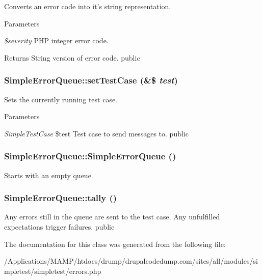 \label{class_simple_error_queue_a686f876e93208736cee9fd57dc8223d9}
Converts an error code into it's string representation. 
\begin{DoxyParams}{Parameters}
\item[{\em \$severity}]PHP integer error code. \end{DoxyParams}
\begin{DoxyReturn}{Returns}
String version of error code.  public 
\end{DoxyReturn}
\hypertarget{class_simple_error_queue_a300faf86411587f253d3bf21203ab0ce}{
\subsubsection[{setTestCase}]{\setlength{\rightskip}{0pt plus 5cm}SimpleErrorQueue::setTestCase (\&\$ {\em test})}}
\label{class_simple_error_queue_a300faf86411587f253d3bf21203ab0ce}
Sets the currently running test case. 
\begin{DoxyParams}{Parameters}
\item[{\em SimpleTestCase}]\$test Test case to send messages to.  public \end{DoxyParams}
\hypertarget{class_simple_error_queue_aefbdb398de53916724572d3432000e80}{
\subsubsection[{SimpleErrorQueue}]{\setlength{\rightskip}{0pt plus 5cm}SimpleErrorQueue::SimpleErrorQueue ()}}
\label{class_simple_error_queue_aefbdb398de53916724572d3432000e80}
Starts with an empty queue. \hypertarget{class_simple_error_queue_a7349f2d81db012130fa9e792077caa76}{
\subsubsection[{tally}]{\setlength{\rightskip}{0pt plus 5cm}SimpleErrorQueue::tally ()}}
\label{class_simple_error_queue_a7349f2d81db012130fa9e792077caa76}
Any errors still in the queue are sent to the test case. Any unfulfilled expectations trigger failures.  public 

The documentation for this class was generated from the following file:\begin{DoxyCompactItemize}
\item 
/Applications/MAMP/htdocs/drump/drupalcodedump.com/sites/all/modules/simpletest/simpletest/errors.php\end{DoxyCompactItemize}
